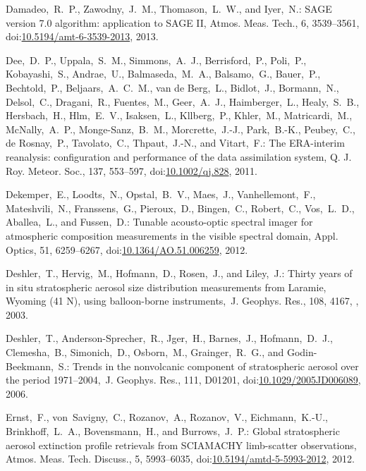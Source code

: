 \documentclass[amtd, online, hvmath]{copernicus}
\begin{document}
\begin{thebibliography}{99}
Damadeo,~R.~P., Zawodny,~J.~M., Thomason,~L.~W., and Iyer,~N.: SAGE version
7.0 algorithm: application to SAGE II, Atmos. Meas. Tech., 6, 3539--3561,
doi:\href{http://dx.doi.org/10.5194/amt-6-3539-2013}{10.5194/amt-6-3539-2013},
2013.



Dee,~D.~P., Uppala,~S.~M., Simmons,~A.~J., Berrisford,~P., Poli,~P.,
Kobayashi,~S., Andrae,~U., Balmaseda,~M.~A., Balsamo,~G., Bauer,~P.,
Bechtold,~P., Beljaars,~A.~C.~M., van de Berg,~L., Bidlot,~J., Bormann,~N.,
Delsol,~C., Dragani,~R., Fuentes,~M., Geer,~A.~J., Haimberger,~L.,
Healy,~S.~B., Hersbach,~H., Hlm,~E.~V., Isaksen,~L., Kllberg,~P., Khler,~M.,
Matricardi,~M., McNally,~A.~P., Monge-Sanz,~B.~M., Morcrette,~J.-J.,
Park,~B.-K., Peubey,~C., de Rosnay,~P., Tavolato,~C., Thpaut,~J.-N., and
Vitart,~F.: The ERA-interim reanalysis: configuration and performance of the
data assimilation system, Q. J. Roy. Meteor. Soc., 137, 553--597,
doi:\href{http://dx.doi.org/10.1002/qj.828}{10.1002/qj.828}, 2011.


Dekemper,~E., Loodts,~N., Opstal,~B.~V., Maes,~J., Vanhellemont,~F.,
Mateshvili,~N., Franssens,~G., Pieroux,~D., Bingen,~C., Robert,~C.,
Vos,~L.~D., Aballea,~L., and Fussen,~D.: Tunable acousto-optic spectral
imager for atmospheric composition measurements in the visible spectral
domain, Appl. Optics, 51, 6259--6267,
doi:\href{http://dx.doi.org/10.1364/AO.51.006259}{10.1364/AO.51.006259},
2012.


Deshler,~T., Hervig,~M., Hofmann,~D., Rosen,~J., and Liley,~J.: Thirty years
of in situ stratospheric aerosol size distribution measurements from Laramie,
Wyoming (41 N), using balloon-borne instruments,~J. Geophys. Res., 108, 4167,
, 2003.


Deshler,~T., Anderson-Sprecher,~R., Jger,~H., Barnes,~J., Hofmann,~D.~J.,
Clemesha,~B., Simonich,~D., Osborn,~M., Grainger,~R.~G., and
Godin-Beekmann,~S.: Trends in the nonvolcanic component of stratospheric
aerosol over the period 1971--2004,~J. Geophys. Res., 111, D01201,
doi:\href{http://dx.doi.org/10.1029/2005JD006089}{10.1029/2005JD006089},
2006.


Ernst,~F., von~Savigny,~C., Rozanov,~A., Rozanov,~V., Eichmann,~K.-U.,
Brinkhoff,~L.~A., Bovensmann,~H., and Burrows,~J.~P.: Global stratospheric
aerosol extinction profile retrievals from SCIAMACHY limb-scatter
observations, Atmos. Meas. Tech. Discuss., 5, 5993--6035,
doi:\href{http://dx.doi.org/10.5194/amtd-5-5993-2012}{10.5194/amtd-5-5993-2012},
2012.





\end{thebibliography}
\end{document}
